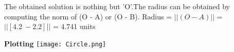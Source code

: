 \documentclass{beamer}
\begin{document}
\begin{frame}
The obtained solution is nothing but 'O'.\newline The radius can be obtained by computing the norm of (O - A) or (O - B).
\newline\newline Radius = $||(O - A)||$ = $||[4.2 \ -2.2]||$ = 4.741 units
\end{frame}
\begin{frame}{\textbf{Plotting}}
\texttt{[image: Circle.png]}  
\end{frame}
\end{document}
